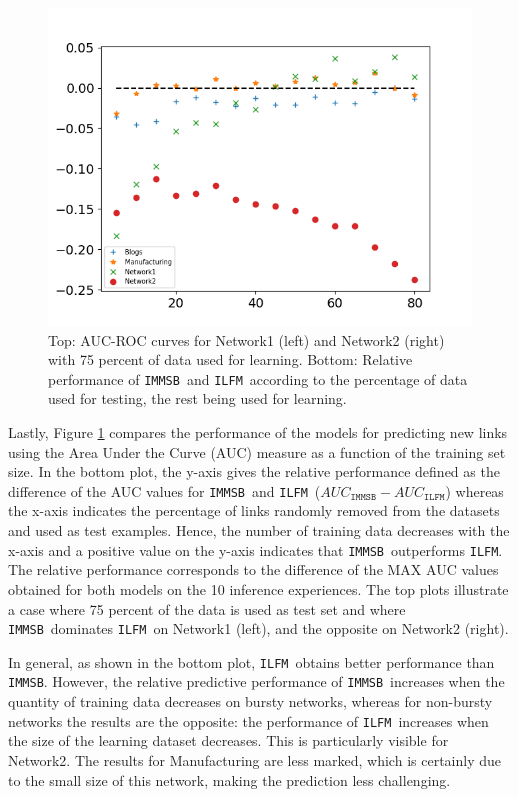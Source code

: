 \documentclass[journal]{IEEEtran}
\newcommand{\ifm}{\texttt{ILFM}}
\newcommand{\imb}{\texttt{IMMSB}}
\begin{document}
\begin{figure}[h]
\begin{minipage}{0.5\textwidth}
        \includegraphics[width=\textwidth]{img/corpus/testset_max_20.png}
    \end{minipage}
    \caption{Top: AUC-ROC curves for Network1 (left) and Network2 (right) with 75 percent of data used for learning. Bottom: Relative performance of \imb\ and \ifm\ according to the percentage of data used for testing, the rest being used for learning.} 
\label{fig:auc}
\end{figure}

Lastly, Figure \ref{fig:auc} compares the performance of the models for predicting new links using the Area Under the Curve (AUC) measure as a function of the training set size. In the bottom plot, the y-axis gives the relative performance defined as the difference of the AUC values for \imb\ and \ifm\ ($AUC_{\imb} - AUC_{\ifm}$) whereas the x-axis indicates the percentage of links randomly removed from the datasets and used as test examples. Hence, the number of training data decreases with the x-axis and a positive value on the y-axis indicates that \imb\ outperforms \ifm.  The relative performance corresponds to the difference of the MAX AUC values obtained for both models on the 10 inference experiences. The top plots illustrate a case where 75 percent of the data is used as test set and where \imb\ dominates \ifm\ on Network1 (left), and the opposite on Network2 (right).

In general, as shown in the bottom plot, \ifm\ obtains better performance than \imb. However, the relative predictive performance of \imb\  increases  when the quantity of training data decreases on bursty networks, whereas for non-bursty networks the results are the opposite: the performance of \ifm\ increases when the size of the learning dataset decreases. This is particularly visible for Network2. The results for Manufacturing are less marked, which is certainly due to the small size of this network, making the prediction less challenging.
\end{document}
